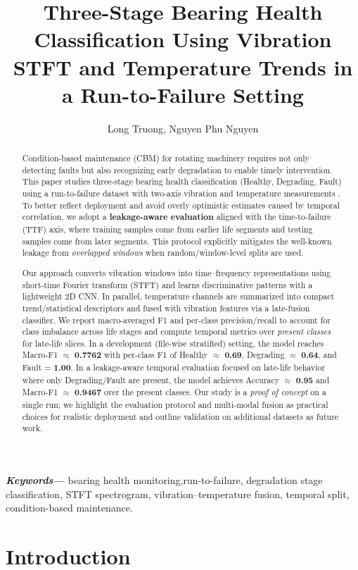 \documentclass{article}
\title
{Three-Stage Bearing Health Classification Using Vibration STFT and Temperature Trends in a Run-to-Failure Setting}
\author{Long Truong, Nguyen Phu Nguyen}
\providecommand{\keywords}[1]
{
  \small	
  \textbf{\textit{Keywords---}} #1
}
\begin{document}
\maketitle

\begin{abstract}
Condition-based maintenance (CBM) for rotating machinery requires not only detecting faults but also recognizing early degradation to enable timely intervention. This paper studies three-stage bearing health classification (Healthy, Degrading, Fault) using a run-to-failure dataset with two-axis vibration and temperature measurements \cite{jung2024dib_rtf,jung2024mendeley_rtf}. To better reflect deployment and avoid overly optimistic estimates caused by temporal correlation, we adopt a \textbf{leakage-aware evaluation} aligned with the time-to-failure (TTF) axis, where training samples come from earlier life segments and testing samples come from later segments. This protocol explicitly mitigates the well-known leakage from \emph{overlapped windows} when random/window-level splits are used.

Our approach converts vibration windows into time--frequency representations using short-time Fourier transform (STFT) and learns discriminative patterns with a lightweight 2D CNN. In parallel, temperature channels are summarized into compact trend/statistical descriptors and fused with vibration features via a late-fusion classifier. We report macro-averaged F1 and per-class precision/recall to account for class imbalance across life stages and compute temporal metrics over \emph{present classes} for late-life slices. In a development (file-wise stratified) setting, the model reaches Macro-F1 $\approx$ \textbf{0.7762} with per-class F1 of Healthy $\approx$ \textbf{0.69}, Degrading $\approx$ \textbf{0.64}, and Fault = \textbf{1.00}. 
In a leakage-aware temporal evaluation focused on late-life behavior where only Degrading/Fault are present, the model achieves Accuracy $\approx$ \textbf{0.95} and Macro-F1 $\approx$ \textbf{0.9467} over the present classes. Our study is a \emph{proof of concept} on a single run; we highlight the evaluation protocol and multi-modal fusion as practical choices for realistic deployment and outline validation on additional datasets as future work.
\end{abstract}
\keywords{bearing health monitoring,run-to-failure, degradation stage classification, STFT spectrogram, vibration–temperature fusion, temporal split, condition-based maintenance.}

\section{Introduction}
\label{sec:intro}
\end{document}
